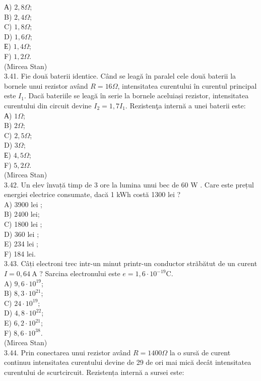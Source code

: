 \documentclass[10pt]{article}
\begin{document}
А) $2,8 \Omega$;\\
B) $2,4 \Omega$;\\
C) $1,8 \Omega$;\\
D) $1,6 \Omega$;\\
Е) $1,4 \Omega$;\\
F) $1,2 \Omega$.\\
(Mircea Stan)\\
3.41. Fie două baterii identice. Când se leagă în paralel cele două baterii la bornele unui rezistor având $R=16 \Omega$, intensitatea curentului în curentul principal este $I_{1}$. Dacă bateriile se leagă în serie la bornele aceluiași rezistor, intensitatea curentului din circuit devine $I_{2}=1,7 I_{1}$. Rezistenţa internă a unei baterii este:\\
А) $1 \Omega$;\\
B) $2 \Omega$;\\
C) $2,5 \Omega$;\\
D) $3 \Omega$;\\
Е) $4,5 \Omega$;\\
F) $5,2 \Omega$.\\
(Mircea Stan)\\
3.42. Un elev învață timp de 3 ore la lumina unui bec de 60 W . Care este prețul energiei electrice consumate, dacă 1 kWh costă 1300 lei ?\\
A) 3900 lei ;\\
B) 2400 lei;\\
C) 1800 lei ;\\
D) 360 lei ;\\
E) 234 lei ;\\
F) 184 lei.\\
3.43. Câți electroni trec intr-un minut printr-un conductor străbătut de un curent $I=0,64 \mathrm{~A}$ ? Sarcina electronului este $e=1,6 \cdot 10^{-19} \mathrm{C}$.\\
A) $9,6 \cdot 10^{19}$;\\
B) $8,3 \cdot 10^{21}$;\\
C) $24 \cdot 10^{19}$;\\
D) $4,8 \cdot 10^{22}$;\\
E) $6,2 \cdot 10^{21}$;\\
F) $8,6 \cdot 10^{38}$.\\
(Mircea Stan)\\
3.44. Prin conectarea unui rezistor având $R=1400 \Omega$ la o sursă de curent continuu intensitatea curentului devine de 29 de ori mai mică decât intensitatea curentului de scurtcircuit. Rezistența internă a sursei este:\\
\end{document}
